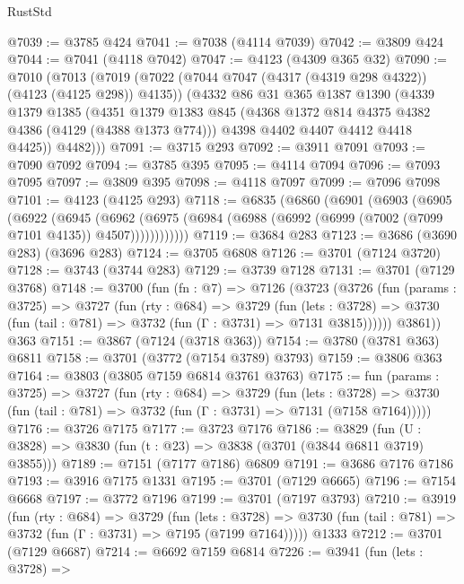 \begin{lexlean}{RustStd}
\begin{coremodule}
@7039 := @3785 @424
@7041 := @7038 (@4114 @7039)
@7042 := @3809 @424
@7044 := @7041 (@4118 @7042)
@7047 := @4123 (@4309 @365 @32)
@7090 := @7010
    (@7013
      (@7019
        (@7022 (@7044 @7047 (@4317 (@4319 @298 @4322)) (@4123 (@4125 @298)) @4135))
        (@4332
          @86
          @31
          @365
          @1387
          @1390
          (@4339
            @1379
            @1385
            (@4351
              @1379
              @1383
              @845
              (@4368 @1372 @814 @4375 @4382 @4386 (@4129 (@4388 @1373 @774)))
              @4398
              @4402
              @4407
              @4412
              @4418
              @4425))
          @4482)))
@7091 := @3715 @293
@7092 := @3911 @7091
@7093 := @7090 @7092
@7094 := @3785 @395
@7095 := @4114 @7094
@7096 := @7093 @7095
@7097 := @3809 @395
@7098 := @4118 @7097
@7099 := @7096 @7098
@7101 := @4123 (@4125 @293)
@7118 := @6835
    (@6860
      (@6901
        (@6903
          (@6905
            (@6922
              (@6945
                (@6962
                  (@6975 (@6984 (@6988 (@6992 (@6999 (@7002 (@7099 @7101 @4135)) @4507))))))))))))
@7119 := @3684 @283
@7123 := @3686 (@3690 @283) (@3696 @283)
@7124 := @3705 @6808
@7126 := @3701 (@7124 @3720)
@7128 := @3743 (@3744 @283)
@7129 := @3739 @7128
@7131 := @3701 (@7129 @3768)
@7148 := @3700
    (fun (fn : @7) =>
    @7126
      (@3723
        (@3726
          (fun (params : @3725) =>
          @3727
            (fun (rty : @684) =>
            @3729
              (fun (lets : @3728) =>
              @3730 (fun (tail : @781) => @3732 (fun (Γ : @3731) => @7131 @3815))))))
        @3861))
    @363
@7151 := @3867 (@7124 (@3718 @363))
@7154 := @3780 (@3781 @363) @6811
@7158 := @3701 (@3772 (@7154 @3789) @3793)
@7159 := @3806 @363
@7164 := @3803 (@3805 @7159 @6814 @3761 @3763)
@7175 := fun (params : @3725) =>
  @3727
    (fun (rty : @684) =>
    @3729
      (fun (lets : @3728) =>
      @3730 (fun (tail : @781) => @3732 (fun (Γ : @3731) => @7131 (@7158 @7164)))))
@7176 := @3726 @7175
@7177 := @3723 @7176
@7186 := @3829 (fun (U : @3828) => @3830 (fun (t : @23) => @3838 (@3701 (@3844 @6811 @3719) @3855)))
@7189 := @7151 (@7177 @7186) @6809
@7191 := @3686 @7176 @7186
@7193 := @3916 @7175 @1331
@7195 := @3701 (@7129 @6665)
@7196 := @7154 @6668
@7197 := @3772 @7196
@7199 := @3701 (@7197 @3793)
@7210 := @3919
    (fun (rty : @684) =>
    @3729
      (fun (lets : @3728) =>
      @3730 (fun (tail : @781) => @3732 (fun (Γ : @3731) => @7195 (@7199 @7164)))))
    @1333
@7212 := @3701 (@7129 @6687)
@7214 := @6692 @7159 @6814
@7226 := @3941
    (fun (lets : @3728) =>

\end{coremodule}
\end{lexlean}
